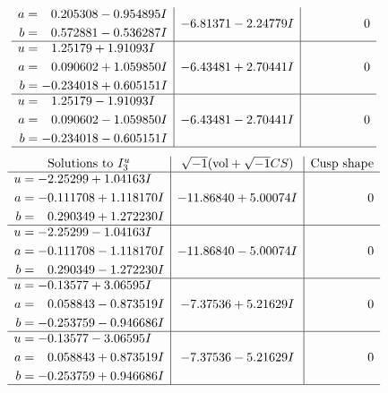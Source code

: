\documentclass[1p]{elsarticle_modified}
\theoremstyle{definition}
\newcommand{\I}{\sqrt{-1}}
\begin{document}
$$\begin{array}{c|c|c}
\begin{aligned}
a &= \phantom{-}0.205308 - 0.954895 I \\
b &= \phantom{-}0.572881 - 0.536287 I\end{aligned}
 & -6.81371 - 2.24779 I & \phantom{-0.000000 } 0 \\ \hline\begin{aligned}
u &= \phantom{-}1.25179 + 1.91093 I \\
a &= \phantom{-}0.090602 + 1.059850 I \\
b &= -0.234018 + 0.605151 I\end{aligned}
 & -6.43481 + 2.70441 I & \phantom{-0.000000 } 0 \\ \hline\begin{aligned}
u &= \phantom{-}1.25179 - 1.91093 I \\
a &= \phantom{-}0.090602 - 1.059850 I \\
b &= -0.234018 - 0.605151 I\end{aligned}
 & -6.43481 - 2.70441 I & \phantom{-0.000000 } 0\\
 \hline 
 \end{array}$$\newpage$$\begin{array}{c|c|c}  
\text{Solutions to }I^u_{3}& \I (\text{vol} + \sqrt{-1}CS) & \text{Cusp shape}\\
 \hline 
\begin{aligned}
u &= -2.25299 + 1.04163 I \\
a &= -0.111708 + 1.118170 I \\
b &= \phantom{-}0.290349 + 1.272230 I\end{aligned}
 & -11.86840 + 5.00074 I & \phantom{-0.000000 } 0 \\ \hline\begin{aligned}
u &= -2.25299 - 1.04163 I \\
a &= -0.111708 - 1.118170 I \\
b &= \phantom{-}0.290349 - 1.272230 I\end{aligned}
 & -11.86840 - 5.00074 I & \phantom{-0.000000 } 0 \\ \hline\begin{aligned}
u &= -0.13577 + 3.06595 I \\
a &= \phantom{-}0.058843 - 0.873519 I \\
b &= -0.253759 - 0.946686 I\end{aligned}
 & -7.37536 + 5.21629 I & \phantom{-0.000000 } 0 \\ \hline\begin{aligned}
u &= -0.13577 - 3.06595 I \\
a &= \phantom{-}0.058843 + 0.873519 I \\
b &= -0.253759 + 0.946686 I\end{aligned}
 & -7.37536 - 5.21629 I & \phantom{-0.000000 } 0\\
 \hline 
 \end{array}$$\newpage
\end{document}
